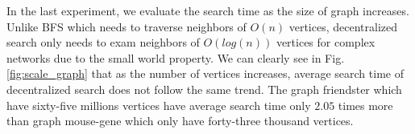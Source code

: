 In the last experiment, we evaluate the search time as the size of graph increases. Unlike BFS which needs to traverse neighbors of $O(n)$ vertices, decentralized search only needs to exam neighbors of $O(log(n))$ vertices for complex networks due to the small world property. We can clearly see in Fig. \ref{fig:scale_graph} that as the number of vertices increases, average search time of decentralized search does not follow the same trend. The graph friendster which have sixty-five millions vertices have average search time only $2.05$ times more than graph mouse-gene which only have forty-three thousand vertices.

%


%
%
